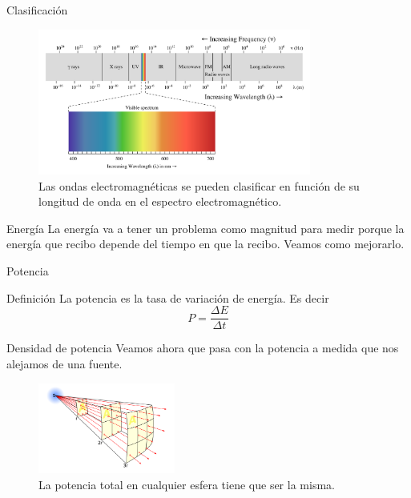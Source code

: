 \documentclass[]{article}
\begin{document}
\begin{frame}{Clasificación}
  \begin{figure}
    \includegraphics[width=0.8\textwidth]{imagenes/espectrum.png}
    \caption{Las ondas electromagnéticas se pueden clasificar en función de su longitud de onda en el espectro electromagnético. }
  \end{figure}
\end{frame}

\begin{frame}{Energía}
  La energía va a tener un problema como magnitud para medir porque la energía que recibo depende del tiempo en que la recibo. Veamos como mejorarlo.
\end{frame}

\begin{frame}{Potencia}
  \begin{block}{Definición}
    La potencia es la tasa de variación de energía. Es decir
    \begin{equation}
      P = \frac{\Delta E}{\Delta t}
    \end{equation}
  \end{block}
\end{frame}


\begin{frame}{Densidad de potencia}
  Veamos ahora que pasa con la potencia a medida que nos alejamos de una fuente.
  \begin{figure}
    \includegraphics[width=0.4\textwidth]{imagenes/inversesquare.png}
    \caption{La potencia total en cualquier esfera tiene que ser la misma. }
  \end{figure}
\end{frame}
\end{document}
